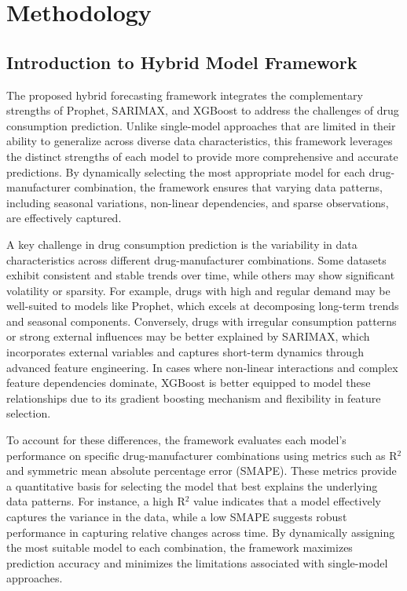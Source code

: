 \documentclass[journal]{IEEEtran}
\begin{document}
\section{Methodology}

\subsection{Introduction to Hybrid Model Framework}

The proposed hybrid forecasting framework integrates the complementary strengths of Prophet, SARIMAX, and XGBoost to address the challenges of drug consumption prediction. Unlike single-model approaches that are limited in their ability to generalize across diverse data characteristics, this framework leverages the distinct strengths of each model to provide more comprehensive and accurate predictions. By dynamically selecting the most appropriate model for each drug-manufacturer combination, the framework ensures that varying data patterns, including seasonal variations, non-linear dependencies, and sparse observations, are effectively captured.

A key challenge in drug consumption prediction is the variability in data characteristics across different drug-manufacturer combinations. Some datasets exhibit consistent and stable trends over time, while others may show significant volatility or sparsity. For example, drugs with high and regular demand may be well-suited to models like Prophet, which excels at decomposing long-term trends and seasonal components. Conversely, drugs with irregular consumption patterns or strong external influences may be better explained by SARIMAX, which incorporates external variables and captures short-term dynamics through advanced feature engineering. In cases where non-linear interactions and complex feature dependencies dominate, XGBoost is better equipped to model these relationships due to its gradient boosting mechanism and flexibility in feature selection.

To account for these differences, the framework evaluates each model’s performance on specific drug-manufacturer combinations using metrics such as R\(^2\) and symmetric mean absolute percentage error (SMAPE). These metrics provide a quantitative basis for selecting the model that best explains the underlying data patterns. For instance, a high R\(^2\) value indicates that a model effectively captures the variance in the data, while a low SMAPE suggests robust performance in capturing relative changes across time. By dynamically assigning the most suitable model to each combination, the framework maximizes prediction accuracy and minimizes the limitations associated with single-model approaches.
\end{document}
